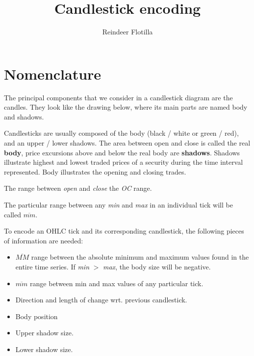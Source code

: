 \documentclass[]{article}
\title{Candlestick encoding}
\author{Reindeer Flotilla}
\begin{document}
\maketitle
\tableofcontents

\section{Nomenclature}

The principal components that we consider in a candlestick diagram are the candles. They look like the drawing below, where its main parts are named body and shadows.

\begin{center}
\end{center}

Candlesticks are usually composed of the body (black / white or green / red), and an upper / lower shadows. The area between open and close is called the real \textbf{body}, price excursions above and below the real body are \textbf{shadows}. Shadows illustrate highest and lowest traded prices of a security during the time interval represented. Body illustrates the opening and closing trades.

The range between \textit{open} and \textit{close} the \textit{OC} range.

The particular range between any \textit{min} and \textit{max} in an individual tick will be called $\overline{mm}$.

To encode an OHLC tick and its corresponding candlestick, the following pieces of information are needed:

\begin{itemize}
	\item $\overline{MM}$ range between the absolute minimum and maximum values found in the entire time series. If \textit{min} $>$ \textit{max}, the body size will be negative.
	\item $\overline{mm}$ range between min and max values of any particular tick.
	\item Direction and length of change wrt. previous candlestick.
	\item Body position
	\item Upper shadow size.
	\item Lower shadow size.
\end{itemize}
\end{document}
